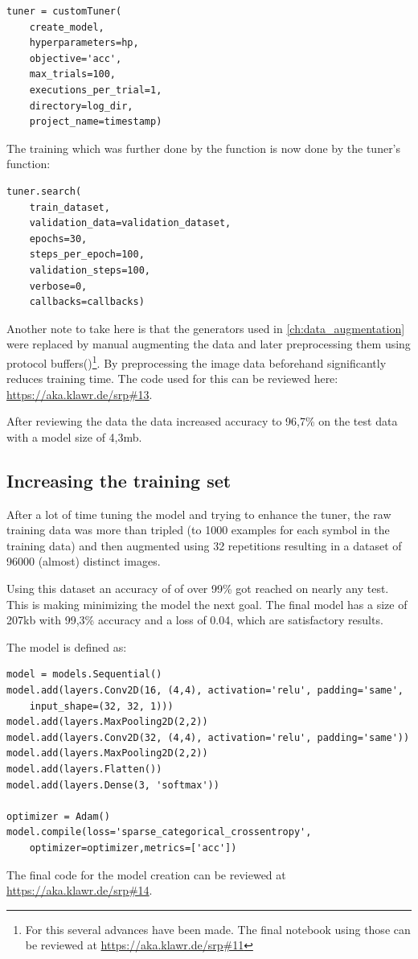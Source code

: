 \begin{lstlisting}
tuner = customTuner(
    create_model,
    hyperparameters=hp,
    objective='acc',
    max_trials=100,
    executions_per_trial=1,
    directory=log_dir,
    project_name=timestamp)
\end{lstlisting}

The training which was further done by the  function is now done by the tuner's  function:

\begin{lstlisting}
tuner.search(
    train_dataset,
    validation_data=validation_dataset,
    epochs=30,
    steps_per_epoch=100,
    validation_steps=100,
    verbose=0,
    callbacks=callbacks)
\end{lstlisting}

Another note to take here is that the generators used in \ref{ch:data_augmentation} were replaced by manual augmenting the data and later preprocessing them using protocol buffers()\footnote{For this several advances have been made. The final notebook using those can be reviewed at \url{https://aka.klawr.de/srp\#11}}.
By preprocessing the image data beforehand significantly reduces training time.
The code used for this can be reviewed here: \url{https://aka.klawr.de/srp\#13}.

After reviewing the data the data increased accuracy to 96,7\% on the test data with a model size of 4,3mb.

\subsection{Increasing the training set}

After a lot of time tuning the model and trying to enhance the tuner, the raw training data was more than tripled (to 1000 examples for each symbol in the training data) and then augmented using 32 repetitions resulting in a dataset of 96000 (almost) distinct images.

Using this dataset an accuracy of of over 99\% got reached on nearly any test. This is making minimizing the model the next goal.
The final model has a size of 207kb with 99,3\% accuracy and a loss of 0.04, which are satisfactory results.

The model is defined as:
\begin{lstlisting}
model = models.Sequential()
model.add(layers.Conv2D(16, (4,4), activation='relu', padding='same',
    input_shape=(32, 32, 1)))
model.add(layers.MaxPooling2D(2,2))
model.add(layers.Conv2D(32, (4,4), activation='relu', padding='same'))
model.add(layers.MaxPooling2D(2,2))
model.add(layers.Flatten())
model.add(layers.Dense(3, 'softmax'))

optimizer = Adam()
model.compile(loss='sparse_categorical_crossentropy',
    optimizer=optimizer,metrics=['acc'])
\end{lstlisting}

The final code for the model creation can be reviewed at \url{https://aka.klawr.de/srp\#14}.